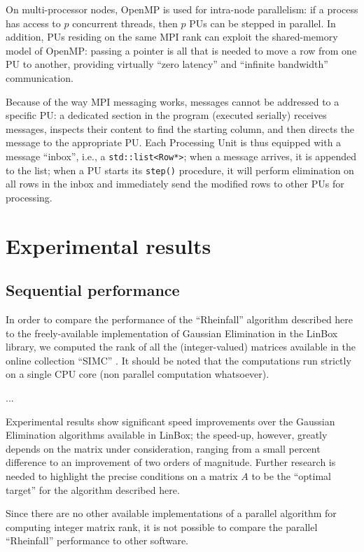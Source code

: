 On multi-processor nodes, OpenMP is used for
intra-node parallelism: if a process has access to $p$ concurrent
threads, then $p$ PUs can be stepped in parallel.  In addition, PUs
residing on the same MPI rank can exploit the shared-memory model of
OpenMP: passing a pointer is all that is needed to move a row from one
PU to another, providing virtually ``zero latency'' and ``infinite bandwidth'' communication.

Because of the way MPI messaging works, messages cannot be addressed
to a specific PU: a dedicated section in the program (executed
serially) receives messages, inspects their content to find the
starting column, and then directs the message to the appropriate PU.
Each Processing Unit is thus equipped with a message ``inbox'', i.e.,
a \verb"std::list<Row*>"; when a message arrives, it is appended to
the list; when a PU starts its \verb"step()" procedure, it will
perform elimination on all rows in the inbox and immediately send the
modified rows to other PUs for processing.


\section{Experimental results}
\label{sec:results}

\subsection{Sequential performance}
\label{sec:performance}

In order to compare the performance of the ``Rheinfall'' algorithm
described here to the freely-available implementation of Gaussian
Elimination in the LinBox library, we computed the rank of all the
(integer-valued) matrices available in the online collection ``SIMC''
\cite{simc}.  It should be noted that the computations run strictly on
a single CPU core (non parallel computation whatsoever).

...

Experimental results show significant speed improvements over the
Gaussian Elimination algorithms available in LinBox; the speed-up,
however, greatly depends on the matrix under consideration, ranging
from a small percent difference to an improvement of two orders of
magnitude.  Further research is needed to highlight the precise
conditions on a matrix $A$ to be the ``optimal target'' for the
algorithm described here.

Since there are no other available implementations of a parallel
algorithm for computing integer matrix rank, it is not possible to
compare the parallel ``Rheinfall'' performance to other software.

